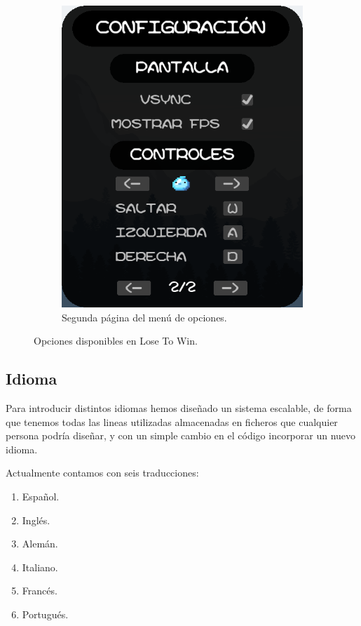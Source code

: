 \documentclass[12pt, spanish]{article}
\begin{document}
\begin{figure}[H]
\begin{subfigure}[b]{0.49\textwidth}
		\includegraphics[width=\textwidth]{"opciones/pagina2_opciones.png"}
		\caption{Segunda página del menú de opciones.}\label{fig:pagina2_opciones}
   \end{subfigure}
	\caption{Opciones disponibles en Lose To Win.}\label{fig:opciones}
\end{figure}

\subsection{Idioma}

Para introducir distintos idiomas hemos diseñado un sistema escalable, de forma que tenemos todas las lineas utilizadas almacenadas en ficheros que cualquier persona podría diseñar, y con un simple cambio en el código incorporar un nuevo idioma.

Actualmente contamos con seis traducciones:

\begin{enumerate}
	\item Español.
	\item Inglés.
	\item Alemán.
	\item Italiano.
	\item Francés.
	\item Portugués.
\end{enumerate}
\end{document}
